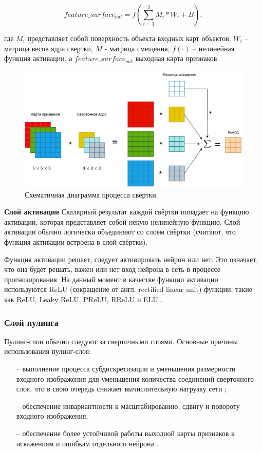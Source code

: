 \begin{equation}
feature\_surface_{out} = f\left(\sum_{i = 3}^3M_i \ast W_i + B\right),
\end{equation}

где $M_i$ представляет собой поверхность объекта входных карт объектов,  $W_i$ -- матрица весов ядра свертки, $M$ - матрица смещения, $f(\cdot)$ -- нелинейная функция активации, а $feature\_surface_{out}$ выходная карта признаков.

\begin{figure}[hbtp]
	\centering
	\includegraphics[width=\textwidth]{img/conv_layer.pdf}
	\caption{Схематичная диаграмма процесса свертки.}
	\label{fig:conv_layer}
\end{figure}

\textbf{Слой активации}
Скалярный результат каждой свёртки попадает на функцию активации, которая представляет собой некую нелинейную функцию. Слой активации обычно логически объединяют со слоем свёртки (считают, что функция активации встроена в слой свёртки). 

Функция активации решает, следует активировать нейрон или нет. Это означает, что она будет решать, важен или нет вход нейрона в сеть в процессе прогнозирования. На данный момент в качестве функции активации используются ReLU (сокращение от англ. rectified linear unit) функции, такие как ReLU, Leaky ReLU, PReLU, RReLU и ELU \cite{relu}.


\subsubsection{Слой пулинга}

Пулинг-слои обычно следуют за сверточными слоями. Основные причины использования пулинг-слоя:
\begin{itemize}[leftmargin=1.6\parindent]
	\item[--] выполнение процесса субдискретизации и уменьшения размерности входного изображения для уменьшения количества соединений сверточного слоя, что в свою очередь снижает вычислительную нагрузку сети \cite{pooling-layer-1};
	\item[--] обеспечение инвариантности к масштабированию, сдвигу и повороту входного изображения\cite{pooling-layer-2};
	\item[--] обеспечение более устойчивой работы выходной карты признаков к искажениям и ошибкам отдельного нейрона \cite{pooling-layer-3}.
\end{itemize}

